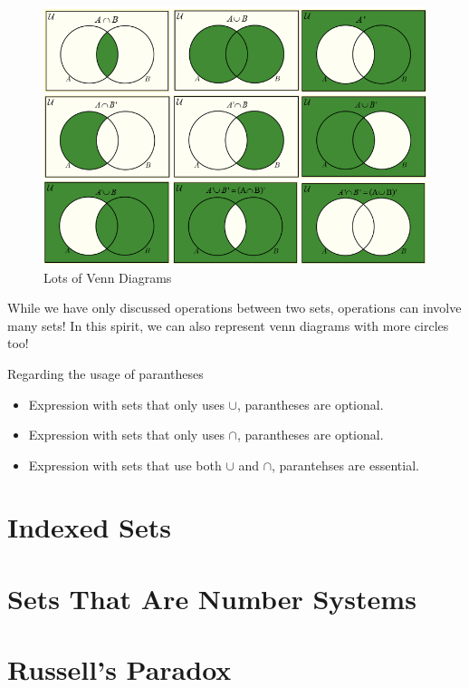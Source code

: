 \documentclass[../Latex-Setup/setup.tex]{subfiles}
\begin{document}
\begin{figure}[H]
    \centering
    \includegraphics[scale=0.45]{./images/Venn-Diagram.jpg}
    \caption{Lots of Venn Diagrams}
\end{figure}
\par

\indent While we have only discussed operations between two sets, operations can involve many sets!
In this spirit, we can also represent venn diagrams with more circles too!\par

\begin{remark}
    Regarding the usage of parantheses
    \begin{itemize}
        \item Expression with sets that only uses $\cup$, parantheses are optional.
        \item Expression with sets that only uses $\cap$, parantheses are optional.
        \item Expression with sets that use both $\cup$ and $\cap$, parantehses are essential.
    \end{itemize}
\end{remark}

\section{Indexed Sets}
\section{Sets That Are Number Systems}
\section{Russell's Paradox}
\end{document}
